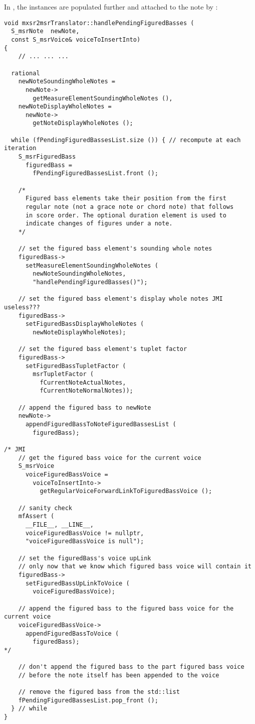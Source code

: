 In , the  instances are populated further and attached to the note by :
\begin{lstlisting}[language=CPlusPlus]
void mxsr2msrTranslator::handlePendingFiguredBasses (
  S_msrNote  newNote,
  const S_msrVoice& voiceToInsertInto)
{
	// ... ... ...

  rational
    newNoteSoundingWholeNotes =
      newNote->
        getMeasureElementSoundingWholeNotes (),
    newNoteDisplayWholeNotes =
      newNote->
        getNoteDisplayWholeNotes ();

  while (fPendingFiguredBassesList.size ()) { // recompute at each iteration
    S_msrFiguredBass
      figuredBass =
        fPendingFiguredBassesList.front ();

    /*
      Figured bass elements take their position from the first
      regular note (not a grace note or chord note) that follows
      in score order. The optional duration element is used to
      indicate changes of figures under a note.
    */

    // set the figured bass element's sounding whole notes
    figuredBass->
      setMeasureElementSoundingWholeNotes (
        newNoteSoundingWholeNotes,
        "handlePendingFiguredBasses()");

    // set the figured bass element's display whole notes JMI useless???
    figuredBass->
      setFiguredBassDisplayWholeNotes (
        newNoteDisplayWholeNotes);

    // set the figured bass element's tuplet factor
    figuredBass->
      setFiguredBassTupletFactor (
        msrTupletFactor (
          fCurrentNoteActualNotes,
          fCurrentNoteNormalNotes));

    // append the figured bass to newNote
    newNote->
      appendFiguredBassToNoteFiguredBassesList (
        figuredBass);

/* JMI
    // get the figured bass voice for the current voice
    S_msrVoice
      voiceFiguredBassVoice =
        voiceToInsertInto->
          getRegularVoiceForwardLinkToFiguredBassVoice ();

    // sanity check
    mfAssert (
      __FILE__, __LINE__,
      voiceFiguredBassVoice != nullptr,
      "voiceFiguredBassVoice is null");

    // set the figuredBass's voice upLink
    // only now that we know which figured bass voice will contain it
    figuredBass->
      setFiguredBassUpLinkToVoice (
        voiceFiguredBassVoice);

    // append the figured bass to the figured bass voice for the current voice
    voiceFiguredBassVoice->
      appendFiguredBassToVoice (
        figuredBass);
*/

    // don't append the figured bass to the part figured bass voice
    // before the note itself has been appended to the voice

    // remove the figured bass from the std::list
    fPendingFiguredBassesList.pop_front ();
  } // while
}
\end{lstlisting}

